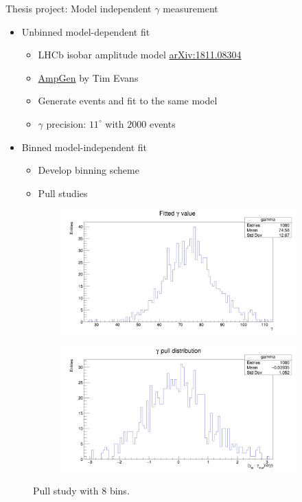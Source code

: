 \documentclass{beamer}
\begin{document}
\begin{frame}{Thesis project: Model independent $\gamma$ measurement}
  \begin{itemize}
    \item{Unbinned model-dependent fit}
    \begin{itemize}
      \item{LHCb isobar amplitude model \href{https://arxiv.org/abs/1811.08304}{arXiv:1811.08304}}
      \item{\href{https://github.com/GooFit/AmpGen}{AmpGen} by Tim Evans}
      \item{Generate events and fit to the same model}
      \item{$\gamma$ precision: $11^\circ$ with $2000$ events}
    \end{itemize}
    \item{Binned model-independent fit}
    \begin{itemize}
      \item{Develop binning scheme}
      \item{Pull studies}
    \end{itemize}
  \end{itemize}
  \begin{figure}
    \centering
    \begin{subfigure}{0.5\textwidth}
      \centering
      \includegraphics[width=\textwidth]{gammafitted.png}
    \end{subfigure}%
    \begin{subfigure}{0.5\textwidth}
      \centering
      \includegraphics[width=\textwidth]{gammapull.png}
    \end{subfigure}
    \caption{Pull study with $8$ bins.}
  \end{figure}
\end{frame}
\end{document}
